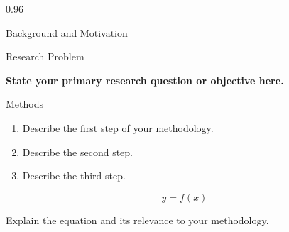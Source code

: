 \documentclass[final]{beamer}
\newlength{\colwidth}
\begin{document}
\begin{frame}[t]
\begin{columns}[t]
\begin{column}{0.96\colwidth}
\begin{block}{Background and Motivation}
\begin{center}

\end{center}


\end{block}



\begin{alertblock}{Research Problem}

\begin{center}

\textbf{
    State your primary research question or objective here.
}

\end{center}

\end{alertblock}



\begin{block}{Methods}

\begin{enumerate}

    \item Describe the first step of your methodology.

    \item Describe the second step.

    \item Describe the third step.

\end{enumerate}


\vspace{0.5cm}

\begin{equation}
    y = f(x)
\end{equation}

\vspace{0.5cm}

Explain the equation and its relevance to your methodology.

\end{block}



\end{column}
\end{columns}
\end{frame}
\end{document}
